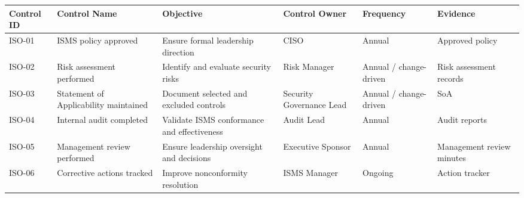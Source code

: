 \documentclass[
  letterpaper,
  DIV=11,
  numbers=noendperiod]{scrartcl}
\begin{document}
\begin{longtable}[]{@{}
  >{\raggedright\arraybackslash}p{}
  >{\raggedright\arraybackslash}p{}
  >{\raggedright\arraybackslash}p{}
  >{\raggedright\arraybackslash}p{}
  >{\raggedright\arraybackslash}p{}
  >{\raggedright\arraybackslash}p{}@{}}
\toprule\noalign{}
\begin{minipage}[b]{\linewidth}\raggedright
Control ID
\end{minipage} & \begin{minipage}[b]{\linewidth}\raggedright
Control Name
\end{minipage} & \begin{minipage}[b]{\linewidth}\raggedright
Objective
\end{minipage} & \begin{minipage}[b]{\linewidth}\raggedright
Control Owner
\end{minipage} & \begin{minipage}[b]{\linewidth}\raggedright
Frequency
\end{minipage} & \begin{minipage}[b]{\linewidth}\raggedright
Evidence
\end{minipage} \\
\midrule\noalign{}
\endhead
\bottomrule\noalign{}
\endlastfoot
ISO-01 & ISMS policy approved & Ensure formal leadership direction &
CISO & Annual & Approved policy \\
ISO-02 & Risk assessment performed & Identify and evaluate security
risks & Risk Manager & Annual / change-driven & Risk assessment
records \\
ISO-03 & Statement of Applicability maintained & Document selected and
excluded controls & Security Governance Lead & Annual / change-driven &
SoA \\
ISO-04 & Internal audit completed & Validate ISMS conformance and
effectiveness & Audit Lead & Annual & Audit reports \\
ISO-05 & Management review performed & Ensure leadership oversight and
decisions & Executive Sponsor & Annual & Management review minutes \\
ISO-06 & Corrective actions tracked & Improve nonconformity resolution &
ISMS Manager & Ongoing & Action tracker \\
\end{longtable}
\end{document}
